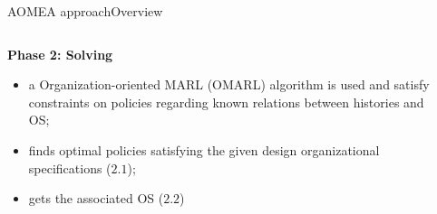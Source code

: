 \begin{frame}{AOMEA approach}{Overview}

    \begin{columns}

        \begin{column}{0.5\textwidth}

            \textbf{Phase 2: Solving}

            \begin{itemize}
                \item a Organization-oriented MARL (OMARL) algorithm is used and satisfy constraints on policies regarding known relations between histories and OS;
                \item finds optimal policies satisfying the given design organizational specifications ($2.1$);
                \item gets the associated OS ($2.2$)
            \end{itemize}

        \end{column}

        \begin{column}{0.5\textwidth}
            \centering
        \end{column}


\end{columns}
\end{frame}
